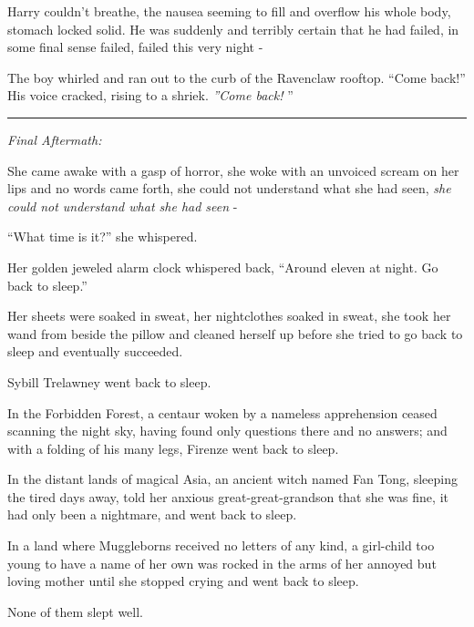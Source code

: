 Harry couldn't breathe, the nausea seeming to fill and overflow his
whole body, stomach locked solid. He was suddenly and terribly certain
that he had failed, in some final sense failed, failed this very night -

The boy whirled and ran out to the curb of the Ravenclaw rooftop. ``Come
back!'' His voice cracked, rising to a shriek. \emph{''Come back!} ''

\begin{center}\rule{3in}{0.4pt}\end{center}

\emph{Final Aftermath:}

She came awake with a gasp of horror, she woke with an unvoiced scream
on her lips and no words came forth, she could not understand what she
had seen, \emph{she could not understand what she had seen} -

``What time is it?'' she whispered.

Her golden jeweled alarm clock whispered back, ``Around eleven at night.
Go back to sleep.''

Her sheets were soaked in sweat, her nightclothes soaked in sweat, she
took her wand from beside the pillow and cleaned herself up before she
tried to go back to sleep and eventually succeeded.

Sybill Trelawney went back to sleep.

In the Forbidden Forest, a centaur woken by a nameless apprehension
ceased scanning the night sky, having found only questions there and no
answers; and with a folding of his many legs, Firenze went back to
sleep.

In the distant lands of magical Asia, an ancient witch named Fan Tong,
sleeping the tired days away, told her anxious great-great-grandson that
she was fine, it had only been a nightmare, and went back to sleep.

In a land where Muggleborns received no letters of any kind, a
girl-child too young to have a name of her own was rocked in the arms of
her annoyed but loving mother until she stopped crying and went back to
sleep.

None of them slept well.

